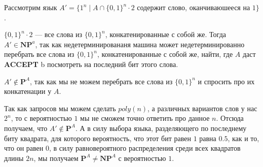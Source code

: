 \begin{solution}

    Рассмотрим язык $A' = \{1^n \mid A \cap \{0, 1\}^n \cdot 2$ содержит слово, оканчиваюшееся на $1 \}$.

    $\{0, 1\}^n \cdot 2$ --- все слова из $\{0, 1\}^n$, конкатенированные с собой же.
    Тогда $A' \in \mathbf{NP}^a$, так как недетерминировананя машина может недетерминированно перебрать все слова
    из $\{0, 1\}^n$, конкатенированные с собой же, найти, где $A$ даст \textbf{ACCEPT} b посмотреть на последний
    бит этого слова.

    $A' \notin \mathbf{P}^A$, так как мы не можем перебрать все слова из $\{0, 1\}^n$ и спросить про их конкатенации у $A$.

    Так как запросов мы можем сделать $poly(n)$, а различных вариантов слов
    у нас $2^n$, то с вероятностью $1$ мы не сможем точно ответить про данное $n$. Отсюда получаем, что
    $A' \notin \mathbf{P}^A$. А в силу выбора языка, разделяющего по последнему биту квадрата, для которого
    вероятность, что этот бит равен $1$ равна $0.5$, как и то, что он равен $0$, в силу равновероятного распределения
    среди всех квадратов длины $2n$, мы получаем $\mathbf{P}^A \neq \mathbf{NP}^A$ с вероятностью $1$.

\end{solution}

